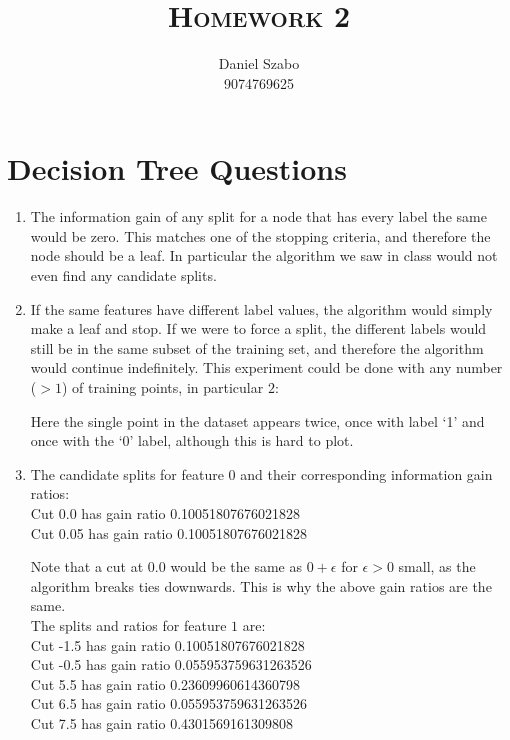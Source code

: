 \documentclass[a4paper]{article}
\title{\textsc{Homework 2}} %
\author{
	Daniel Szabo \\
	9074769625\\
}
\date{}
\theoremstyle{definition}
\begin{document}
	
	\maketitle 
	
	\section{Decision Tree Questions}
	
	\begin{enumerate}
		\item The information gain of any split for a node that has every label the same would be zero. This matches one of the stopping criteria, and therefore the node should be a leaf. In particular the algorithm we saw in class would not even find any candidate splits.
		
		\item If the same features have different label values, the algorithm would simply make a leaf and stop. If we were to force a split, the different labels would still be in the same subset of the training set, and therefore the algorithm would continue indefinitely. This experiment could be done with any number ($ >1 $) of training points, in particular $ 2 $:
		
	
		Here the single point in the dataset appears twice, once with label `1' and once with the `0' label, although this is hard to plot.
		
		\item The candidate splits for feature $ 0 $ and their corresponding information gain ratios:\\
		Cut 0.0 has gain ratio 0.10051807676021828\\
		Cut 0.05 has gain ratio 0.10051807676021828
		
		Note that a cut at $ 0.0 $ would be the same as $ 0+\epsilon $ for $ \epsilon>0 $ small, as the algorithm breaks ties downwards. This is why the above gain ratios are the same.\\
		The splits and ratios for feature $ 1 $ are:\\
		Cut -1.5 has gain ratio 0.10051807676021828\\
		Cut -0.5 has gain ratio 0.055953759631263526\\
		Cut 5.5 has gain ratio 0.23609960614360798\\
		Cut 6.5 has gain ratio 0.055953759631263526\\
		Cut 7.5 has gain ratio 0.4301569161309808
		

\end{enumerate}
\end{document}
